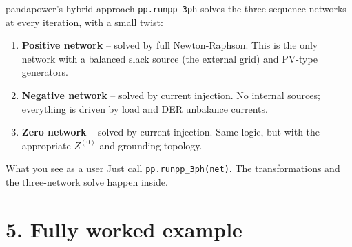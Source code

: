 \documentclass[aspectratio=169,10pt]{beamer}
\newcommand{\code}[1]{\texttt{#1}}
\begin{document}
\begin{frame}{pandapower's hybrid approach}
\code{pp.runpp\_3ph} solves the three sequence networks at every iteration, with a small twist:
\begin{enumerate}
  \item \textbf{Positive network} -- solved by full Newton-Raphson. This is the only network with a balanced slack source (the external grid) and PV-type generators.
  \item \textbf{Negative network} -- solved by current injection. No internal sources; everything is driven by load and DER unbalance currents.
  \item \textbf{Zero network} -- solved by current injection. Same logic, but with the appropriate $Z^{(0)}$ and grounding topology.
\end{enumerate}
\vspace{0.4em}
\centering
{}
\vspace{0.3em}
\begin{block}{What you see as a user}
Just call \code{pp.runpp\_3ph(net)}. The transformations and the three-network solve happen inside.
\end{block}
\end{frame}

\section*{5. Fully worked example}
\end{document}
